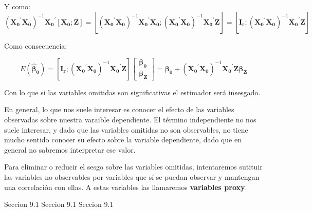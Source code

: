 Y como:
\[\left(\boldsymbol{X_0}^{\prime}\boldsymbol{X_0}\right)^{-1}\boldsymbol{X_0}^{\prime}\left[\boldsymbol{X_0}; \boldsymbol{Z}\right]=\left[\left(\boldsymbol{X_0}^{\prime}\boldsymbol{X_0}\right)^{-1}\boldsymbol{X_0}^{\prime}\boldsymbol{X_0};\left(\boldsymbol{X_0}^{\prime}\boldsymbol{X_0}\right)^{-1}\boldsymbol{X_0}^{\prime}\boldsymbol{Z}\right]=\left[\boldsymbol{I_r};\left(\boldsymbol{X_0}^{\prime}\boldsymbol{X_0}\right)^{-1}\boldsymbol{X_0}^{\prime}\boldsymbol{Z}\right]\]

Como consecuencia:

\[E(\hat{\boldsymbol{\beta}}_{\boldsymbol{0}})=\left[\boldsymbol{I_r};\left(\boldsymbol{X_0}^{\prime}\boldsymbol{X_0}\right)^{-1}\boldsymbol{X_0}^{\prime}\boldsymbol{Z}\right]\left[\begin{matrix}
\boldsymbol{\beta_0} \\
\boldsymbol{\beta_Z}
\end{matrix}\right]=\boldsymbol{\beta_0}+\left(\boldsymbol{X_0}^{\prime}\boldsymbol{X_0}\right)^{-1}\boldsymbol{X_0}^{\prime}\boldsymbol{Z}\boldsymbol{\beta_Z}\]

Con lo que si las variables omitidas son significativas el estimador ser\'a insesgado.

En general, lo que nos suele interesar es conocer el efecto de las variables observadas sobre nuestra varaible dependiente. El t\'ermino independiente no nos suele interesar, y dado que las
variables omitidas no son observables, no tiene mucho sentido conocer su efecto sobre la variable dependiente, dado que en general no sabremos interpretar ese valor.

Para eliminar o reducir el sesgo sobre las variables omitidas, intentaremos sutituir las variables no observables por variables que s\'i se puedan observar y mantengan una correlaci\'on con ellas. A estas variables las llamaremos \textbf{variables proxy}.

Seccion 9.1
Seccion 9.1
Seccion 9.1